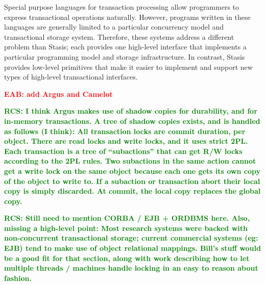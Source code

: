 \documentclass[letterpaper,twocolumn,10pt]{article}
\newcommand{\yad}{Stasis\xspace}
\newcommand{\eab}[1]{\textcolor{red}{\bf EAB: #1}}
\newcommand{\rcs}[1]{\textcolor{green}{\bf RCS: #1}}
\begin{document}
Special purpose languages for transaction processing allow programmers
to express transactional operations naturally.  However, programs
written in these languages are generally limited to a particular
concurrency model and transactional storage system.  Therefore, these
systems address a different problem than \yad; each provides one
high-level interface that implements a particular programming model
and storage infrastructure.  In contrast, \yad provides low-level
primitives that make it easier to implement and support new types of
high-level transactional interfaces.



\eab{add Argus and Camelot}

\rcs{ I think Argus makes use of shadow copies for durability, and for
in-memory transactions.  A tree of shadow copies exists, and is handled as
follows (I think): All transaction locks are commit duration, per
object.  There are read locks and write locks, and it uses strict 2PL.
Each transaction is a tree of ``subactions'' that can get R/W locks
according to the 2PL rules.  Two subactions in the same action cannot
get a write lock on the same object because each one gets its own copy
of the object to write to.  If a subaction or transaction abort their
local copy is simply discarded.  At commit, the local copy replaces
the global copy.}

\rcs{Still need to mention CORBA / EJB + ORDBMS here. Also, missing a high-level point:  Most research systems were backed with
non-concurrent transactional storage; current commercial systems (eg:
EJB) tend to make use of object relational mappings.  Bill's stuff would be a good fit for that section, along with work describing how to let multiple threads / machines handle locking in an easy to reason about fashion.}


\end{document}
